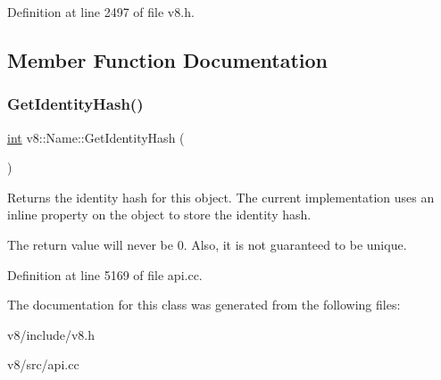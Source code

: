 Definition at line 2497 of file v8.\+h.



\subsection{Member Function Documentation}
\mbox{\label{classv8_1_1Name_aef60fce47685fad12914304f6bc52bf2}} 
\subsubsection{\texorpdfstring{Get\+Identity\+Hash()}{GetIdentityHash()}}
{\footnotesize\ttfamily \mbox{\hyperlink{classint}{int}} v8\+::\+Name\+::\+Get\+Identity\+Hash (\begin{DoxyParamCaption}{ }\end{DoxyParamCaption})}

Returns the identity hash for this object. The current implementation uses an inline property on the object to store the identity hash.

The return value will never be 0. Also, it is not guaranteed to be unique. 

Definition at line 5169 of file api.\+cc.



The documentation for this class was generated from the following files\+:\begin{DoxyCompactItemize}
\item 
v8/include/v8.\+h\item 
v8/src/api.\+cc\end{DoxyCompactItemize}
